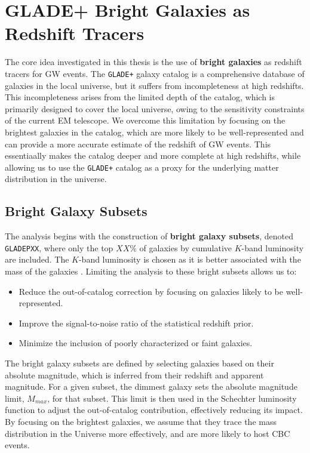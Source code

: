 \chapter{GLADE+ Bright Galaxies as Redshift Tracers}
\label{chap:methodology}

The core idea investigated in this thesis is the use of \textbf{bright galaxies} as redshift tracers for \ac{GW} events. The \texttt{GLADE+} galaxy catalog is a comprehensive database of galaxies in the local universe, but it suffers from incompleteness at high redshifts. This incompleteness arises from the limited depth of the catalog, which is primarily designed to cover the local universe, owing to the sensitivity constraints of the current \ac{EM} telescope. We overcome this limitation by focusing on the brightest galaxies in the catalog, which are more likely to be well-represented and can provide a more accurate estimate of the redshift of \ac{GW} events. This essentiaally makes the catalog deeper and more complete at high redshifts, while allowing us to use the \texttt{GLADE+} catalog as a proxy for the underlying matter distribution in the universe.


\section{Bright Galaxy Subsets}
The analysis begins with the construction of \textbf{bright galaxy subsets}, denoted \texttt{GLADEPXX}, where only the top $XX\%$ of galaxies by cumulative $K$-band luminosity are included. The $K$-band luminosity is chosen as it is better associated with the mass of the galaxies \citep{strazzullo2006near,sureshkumar2021galaxy}. Limiting the analysis to these bright subsets allows us to:
\vspace{-1em}
\begin{itemize}
  \item Reduce the out-of-catalog correction by focusing on galaxies likely to be well-represented.
  \vspace{-1em}
  \item Improve the signal-to-noise ratio of the statistical redshift prior.
  \vspace{-1em}
  \item Minimize the inclusion of poorly characterized or faint galaxies.
\end{itemize}

The bright galaxy subsets are defined by selecting galaxies based on their absolute magnitude, which is inferred from their redshift and apparent magnitude. For a given subset, the dimmest galaxy sets the absolute magnitude limit, $M_{max}$, for that subset. This limit is then used in the Schechter luminosity function to adjust the out-of-catalog contribution, effectively reducing its impact. By focusing on the brightest galaxies, we assume that they trace the mass distribution in the Universe more effectively, and are more likely to host \ac{CBC} events.

